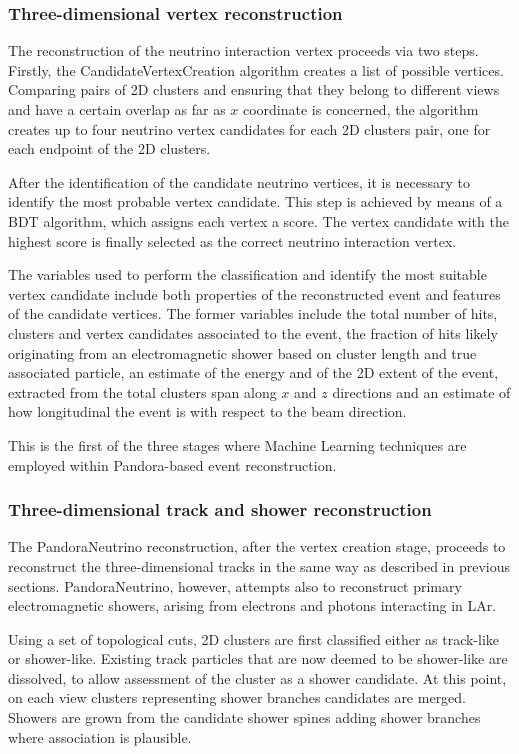 \subsubsection{Three-dimensional vertex reconstruction}

The reconstruction of the neutrino interaction vertex proceeds via two steps. Firstly, the CandidateVertexCreation algorithm creates a list of possible vertices. Comparing pairs of 2D clusters and ensuring that they belong to different views and have a certain overlap as far as $x$ coordinate is concerned, the algorithm creates up to four neutrino vertex candidates for each 2D clusters pair, one for each endpoint of the 2D clusters. 

After the identification of the candidate neutrino vertices, it is necessary to identify the most probable vertex candidate. This step is achieved by means of a BDT algorithm, which assigns each vertex a score. The vertex candidate with the highest score is finally selected as the correct neutrino interaction vertex. 

The variables used to perform the classification and identify the most suitable vertex candidate include both properties of the reconstructed event and features of the candidate vertices. The former variables include the total number of hits, clusters and vertex candidates associated to the event, the fraction of hits likely originating from an electromagnetic shower based on cluster length and true associated particle, an estimate of the energy and of the 2D extent of the event, extracted from the total clusters span along $x$ and $z$ directions and an estimate of how longitudinal the event is with respect to the beam direction. 

This is the first of the three stages where Machine Learning techniques are employed within Pandora-based event reconstruction. 

\subsubsection{Three-dimensional track and shower reconstruction}

The PandoraNeutrino reconstruction, after the vertex creation stage, proceeds to reconstruct the three-dimensional tracks in the same way as described in previous sections. PandoraNeutrino, however, attempts also to reconstruct primary electromagnetic showers, arising from electrons and photons interacting in LAr. 

Using a set of topological cuts, 2D clusters are first classified either as track-like or shower-like. Existing track particles that are now deemed to be shower-like are dissolved, to allow assessment of the cluster as a shower candidate. At this point, on each view clusters representing shower branches candidates are merged. Showers are grown from the candidate shower spines adding shower branches where association is plausible. 


